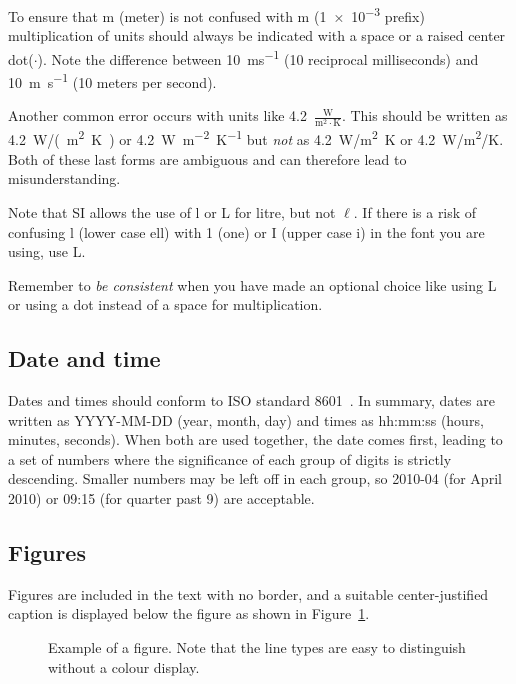 \documentclass[a5paper, 10pt]{article}
\begin{document}
To ensure that m (meter) is not confused with m (\num{1e-3} prefix) multiplication of units should always be indicated with a space or a raised center dot($\cdot$).
Note the difference between \SI{10}{ms^{-1}} (10 reciprocal milliseconds) and \SI{10}{m.s^{-1}} (10 meters per second).

Another common error occurs with units like 
\num{4.2}~$\frac{\mathrm{W}}{\mathrm{m}^2\cdot\mathrm{K}}$.  
This should be written as \SI{4.2}{W/(m^2.K)} or
\SI{4.2}{W.m^{-2}.K^{-1}} 
but \emph{not} as \SI{4.2}{W/m^2K} or \SI{4.2}{W/m^2/K}.  
Both of these last forms are ambiguous and can therefore lead to misunderstanding.

Note that SI allows the use of l or L for litre, but not $\ell$.
If there is a risk of confusing l (lower case ell) with 1 (one) or I (upper case i) in the font you are using, use L.

Remember to \emph{be consistent} when you have made an optional choice like using L or using a dot instead of a space for multiplication.

\subsection{Date and time}
Dates and times should conform to ISO standard 8601~\citep{isodates}.
In summary, dates are written as YYYY-MM-DD (year, month, day) and times as hh:mm:ss (hours, minutes, seconds).  
When both are used together, the date comes first, leading to a set of numbers where the significance of each group of digits is strictly descending.
Smaller numbers may be left off in each group, so 2010-04 (for April 2010) or 09:15 (for quarter past 9) are acceptable.

\subsection{Figures}
Figures are included in the text with no border, and a suitable center-justified caption is displayed below the figure as shown in Figure~\ref{fig:figexample}.

\begin{figure}[htbp]
  \centering
  \caption{Example of a figure.  Note that the line types are easy to
    distinguish without a colour display.  }
  \label{fig:figexample}
\end{figure}
\end{document}
